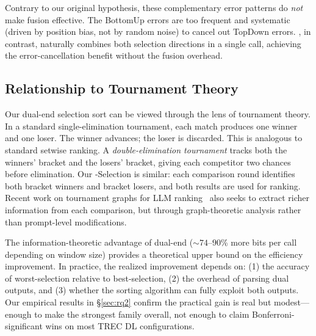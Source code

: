 Contrary to our original hypothesis, these complementary error patterns do \emph{not} make \bidir{} fusion effective. The BottomUp errors are too frequent and systematic (driven by position bias, not by random noise) to cancel out TopDown errors. \dualend{}, in contrast, naturally combines both selection directions in a single call, achieving the error-cancellation benefit without the fusion overhead.


\subsection{Relationship to Tournament Theory}
\label{sec:tournament}

Our dual-end selection sort can be viewed through the lens of tournament theory. In a standard single-elimination tournament, each match produces one winner and one loser. The winner advances; the loser is discarded. This is analogous to standard setwise ranking. A \emph{double-elimination tournament} tracks both the winners' bracket and the losers' bracket, giving each competitor two chances before elimination. Our \dualend{}-Selection is similar: each comparison round identifies both bracket winners and bracket losers, and both results are used for ranking. Recent work on tournament graphs for LLM ranking~\citep{blitzrank2026} also seeks to extract richer information from each comparison, but through graph-theoretic analysis rather than prompt-level modifications.

The information-theoretic advantage of dual-end ($\sim$$74$--$90$\% more bits per call depending on window size) provides a theoretical upper bound on the efficiency improvement. In practice, the realized improvement depends on: (1) the accuracy of worst-selection relative to best-selection, (2) the overhead of parsing dual outputs, and (3) whether the sorting algorithm can fully exploit both outputs. Our empirical results in \S\ref{sec:rq2} confirm the practical gain is real but modest---enough to make \dualend{} the strongest family overall, not enough to claim Bonferroni-significant wins on most TREC DL configurations.
